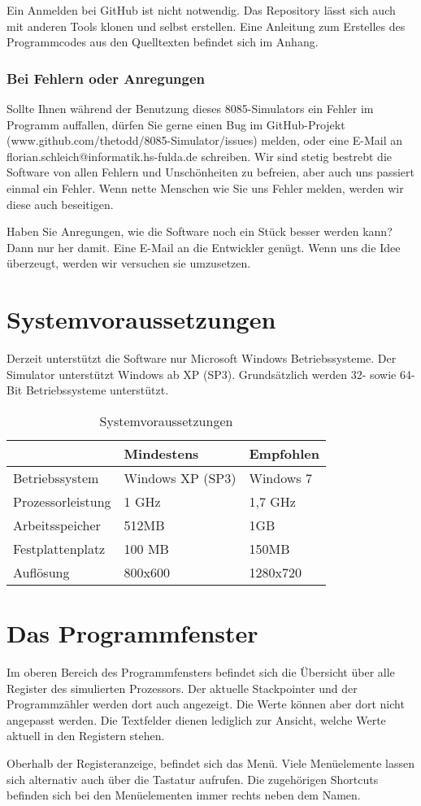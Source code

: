 \documentclass[11pt,a4paper]{hsfuldabook}
\begin{document}
Ein Anmelden bei GitHub ist nicht notwendig. Das Repository lässt sich auch mit anderen Tools
klonen und selbst erstellen. Eine Anleitung zum Erstelles des Programmcodes aus den Quelltexten befindet
sich im Anhang.

\subsection{Bei Fehlern oder Anregungen}
Sollte Ihnen während der Benutzung dieses 8085-Simulators ein Fehler im Programm auffallen, dürfen
Sie gerne einen Bug im GitHub-Projekt (www.github.com/thetodd/8085-Simulator/issues) melden,
oder eine E-Mail an florian.schleich@informatik.hs-fulda.de schreiben. Wir sind stetig bestrebt die
Software von allen Fehlern und Unschönheiten zu befreien, aber auch uns passiert einmal ein Fehler.
Wenn nette Menschen wie Sie uns Fehler melden, werden wir diese auch beseitigen.

Haben Sie Anregungen, wie die Software noch ein Stück besser werden kann? Dann nur her damit. Eine
E-Mail an die Entwickler genügt. Wenn uns die Idee überzeugt, werden wir versuchen sie umzusetzen.

\chapter{Systemvoraussetzungen}
Derzeit unterstützt die Software nur Microsoft Windows Betriebssysteme. Der Simulator unterstützt
Windows ab XP (SP3). Grundsätzlich werden 32- sowie 64-Bit Betriebssysteme unterstützt.
\begin{table}[h!]
	\begin{tabular}{l || l | l}
	 & Mindestens & Empfohlen \\
	 \hline
	 Betriebssystem & Windows XP (SP3) & Windows 7\\
	 Prozessorleistung & 1 GHz & 1,7 GHz \\
	 Arbeitsspeicher & 512MB & 1GB \\
	 Festplattenplatz & 100 MB & 150MB \\
	 Auflösung & 800x600 & 1280x720 \\
	\end{tabular}
	\caption{Systemvoraussetzungen}
\end{table}

\chapter{Das Programmfenster}
Im oberen Bereich des Programmfensters befindet sich die Übersicht über alle Register des simulierten
Prozessors. Der aktuelle Stackpointer und der Programmzähler werden dort auch angezeigt. Die Werte
können aber dort nicht angepasst werden. Die Textfelder dienen lediglich zur Ansicht, welche Werte
aktuell in den Registern stehen.

Oberhalb der Registeranzeige, befindet sich das Menü. Viele Menüelemente lassen sich alternativ auch
über die Tastatur aufrufen. Die zugehörigen Shortcuts befinden sich bei den Menüelementen immer rechts
neben dem Namen.
\end{document}
